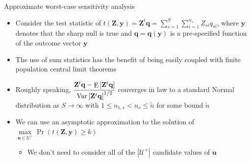 \documentclass[table, xcolor={dvipsnames}, 9pt]{beamer}
\theoremstyle{newstyle}
\DeclareMathOperator{\E}{\mathrm{E}}
\DeclareMathOperator{\Var}{\rm{Var}}
\begin{document}
\begin{frame}{Approximate worst-case sensitivity analysis}
\begin{itemize}
\item Consider the test statistic of $t\left(\mathbf{Z}, \mathbf{y}\right) = \mathbf{Z}^t\mathbf{q} = \sum \limits_{s = 1}^S \sum \limits_{i = 1}^{n_s} Z_{si} q_{si}$, where $\mathbf{y}$ denotes that the sharp null is true and $\mathbf{q} = \mathbf{q}\left(\mathbf{y}\right)$ is a pre-specified function of the outcome vector $\mathbf{y}$
\item \pause The use of sum statistics has the benefit of being easily coupled with finite population central limit theorems \citep[see][]{liding2017}
\item \pause Roughly speaking, $\cfrac{\mathbf{Z}^t\mathbf{q} - \E\left[\mathbf{Z}^t \mathbf{q}\right]}{\Var\left[\mathbf{Z}^t\mathbf{q} \right]^{1/2}}$ converges in law to a standard Normal distribution as $S \to \infty$ with $1 \leq n_{1,s} < n_s \leq \tilde{n}$ for some bound $\tilde{n}$ \citep[see][]{gastwirthetal2000}
\item \pause We can use an asymptotic approximation to the solution of $\max \limits_{\mathbf{u} \in \mathcal{U}^+} \Pr\left(t\left(\mathbf{Z}, \mathbf{y}\right) \geq k \right)$ 
\begin{itemize}
\item \pause We don't need to consider all of the $\left\lvert\mathcal{U}^+\right\rvert$ candidate values of $\mathbf{u}$
\end{itemize}
\end{itemize}
\end{frame}
\end{document}

